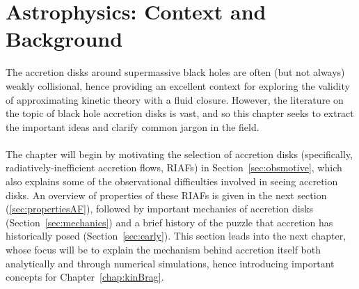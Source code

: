 \chapter{Astrophysics: Context and Background} \label{chap:astrophysics}
The accretion disks around supermassive black holes are often (but not always) weakly collisional, hence providing an excellent context for exploring the validity of approximating kinetic theory with a fluid closure. However, the literature on the topic of black hole accretion disks is vast, and so this chapter seeks to extract the important ideas and clarify common jargon in the field.\\
\\
The chapter will begin by motivating the selection of accretion disks (specifically, radiatively-inefficient accretion flows, RIAFs) in Section~\ref{sec:obsmotive}, which also explains some of the observational difficulties involved in seeing accretion disks. An overview of properties of these RIAFs is given in the next section (\ref{sec:propertiesAF}), followed by important mechanics of accretion disks (Section~\ref{sec:mechanics}) and a brief history of the puzzle that accretion has historically posed (Section~\ref{sec:early}). This section leads into the next chapter, whose focus will be to explain the mechanism behind accretion itself both analytically and through numerical simulations, hence introducing important concepts for Chapter~\ref{chap:kinBrag}.  

